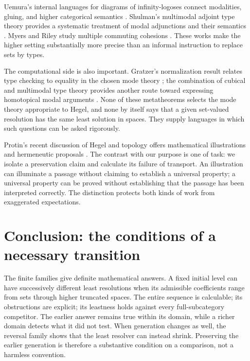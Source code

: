 Uemura's internal languages for diagrams of infinity-logoses connect
modalities, gluing, and higher categorical semantics \cite{Uemura}.
Shulman's multimodal adjoint type theory provides a systematic treatment
of modal adjunctions and their semantics \cite{Shulman}. Myers and Riley
study multiple commuting cohesions \cite{MyersRiley}. These works make
the higher setting substantially more precise than an informal instruction
to replace sets by types.

The computational side is also important. Gratzer's normalization result
relates type checking to equality in the chosen mode theory
\cite{Gratzer}; the combination of cubical and multimodal type theory
provides another route toward expressing homotopical modal arguments
\cite{AagaardEtAl}. None of these metatheorems selects the mode theory
appropriate to Hegel, and none by itself says that a given set-valued
resolution has the same least solution in spaces. They supply languages
in which such questions can be asked rigorously.

Protin's recent discussion of Hegel and topology offers mathematical
illustrations and hermeneutic proposals \cite{Protin}. The contrast with
our purpose is one of task: we isolate a preservation claim and calculate
its failure of transport. An illustration can illuminate a passage without
claiming to establish a universal property; a universal property can be
proved without establishing that the passage has been interpreted correctly.
The distinction protects both kinds of work from exaggerated expectations.

\section{Conclusion: the conditions of a necessary transition}
\label{sec:conclusion}

The finite families give definite mathematical answers. A fixed initial
level can have successively different least resolutions when its admissible
coefficients range from sets through higher truncated spaces. The entire
sequence is calculable; its obstructions are explicit; its leastness holds
against every full-subcategory competitor. The earlier answer remains
true within its domain, while a richer domain detects what it did not test.
When generation changes as well, the reversal family shows that the least
resolver can instead shrink. Preserving the earlier generation is therefore
a substantive condition on a comparison, not a harmless convention.


